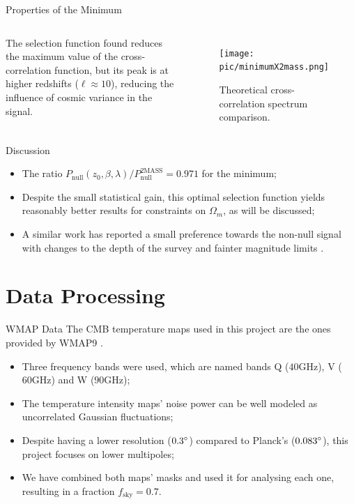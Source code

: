\documentclass[serif, aspectratio=169]{beamer}
\begin{document}
\begin{frame}{Properties of the Minimum}
    \begin{columns}
        The selection function found reduces the maximum value of the cross-correlation function, but its peak is at higher redshifts ($\ell\approx 10$), reducing the influence of cosmic variance in the signal.
        
        \begin{figure}
            \centering
            \texttt{[image: pic/minimumX2mass.png]}
            \caption{Theoretical cross-correlation spectrum comparison.}
            \label{fig:minimum_cross_corr}
        \end{figure}
    \end{columns}
\end{frame}

\begin{frame}{Discussion}
    \begin{itemize}
        \item The ratio $P_\text{null}(z_0,\beta, \lambda)/P_\text{null}^\text{2MASS}=0.971$ for the minimum;
        \item Despite the small statistical gain, this optimal selection function yields reasonably better results for constraints on $\Omega_m$, as will be discussed;
        \item A similar work has reported a small preference towards the non-null signal with changes to the depth of the survey and fainter magnitude limits \cite{simillar_ISW_analysis}.
    \end{itemize}
\end{frame}

\section{Data Processing}

\begin{frame}{WMAP Data}
The CMB temperature maps used in this project are the ones provided by WMAP9 \cite{wmap_supplement}.

\begin{itemize}
	\item Three frequency bands were used, which are named bands Q ($40\text{GHz}$), V ($60\text{GHz}$) and W ($90\text{GHz}$);
	\item The temperature intensity maps' noise power can be well modeled as uncorrelated Gaussian fluctuations;
	\item Despite having a lower resolution ($0.3\degree$) compared to Planck's ($0.083\degree$), this project focuses on lower multipoles;
	\item We have combined both maps' masks and used it for analysing each one, resulting in a fraction $f_\text{sky}=0.7$.
\end{itemize}
\end{frame}
\end{document}
